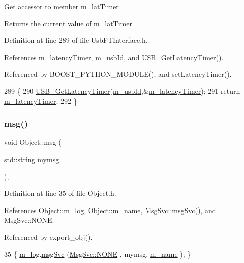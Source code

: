 Get accessor to member m\+\_\+lat\+Timer \begin{DoxyReturn}{Returns}
the current value of m\+\_\+lat\+Timer 
\end{DoxyReturn}


Definition at line 289 of file Usb\+F\+T\+Interface.\+h.



References m\+\_\+latency\+Timer, m\+\_\+usb\+Id, and U\+S\+B\+\_\+\+Get\+Latency\+Timer().



Referenced by B\+O\+O\+S\+T\+\_\+\+P\+Y\+T\+H\+O\+N\+\_\+\+M\+O\+D\+U\+L\+E(), and set\+Latency\+Timer().


\begin{DoxyCode}
289                                 \{
290     \hyperlink{LALUsbML_8h_a90c0ec96b211bb1b45c4b26afe6f6ced}{USB\_GetLatencyTimer}(\hyperlink{classUsbFTInterface_a91df5c0547e8be460bc087e27afe05aa}{m\_usbId},&\hyperlink{classUsbFTInterface_a0eefe6f2cee132da70176562cd126718}{m\_latencyTimer});
291     \textcolor{keywordflow}{return} \hyperlink{classUsbFTInterface_a0eefe6f2cee132da70176562cd126718}{m\_latencyTimer};
292   \}
\end{DoxyCode}
\mbox{\label{classObject_a58b2d0618c2d08cf2383012611528d97}} 
\subsubsection{\texorpdfstring{msg()}{msg()}\hspace{0.1cm}{\footnotesize\ttfamily [1/2]}}
{\footnotesize\ttfamily void Object\+::msg (\begin{DoxyParamCaption}\item[{std\+::string}]{mymsg }\end{DoxyParamCaption})\hspace{0.3cm}{\ttfamily [inline]}, {\ttfamily [inherited]}}



Definition at line 35 of file Object.\+h.



References Object\+::m\+\_\+log, Object\+::m\+\_\+name, Msg\+Svc\+::msg\+Svc(), and Msg\+Svc\+::\+N\+O\+NE.



Referenced by export\+\_\+obj().


\begin{DoxyCode}
35 \{ \hyperlink{classObject_a0d269813dd7ac1f24bc143031e2963f2}{m\_log}.\hyperlink{classMsgSvc_ad25f18047920cc59a314e5098259711c}{msgSvc} (\hyperlink{classMsgSvc_ae671eb7301996cd049d2da8a65925926a9be9ae32fed8e1e6eba4a58692210fbd}{MsgSvc::NONE}    , mymsg, \hyperlink{classObject_a8b83c95c705d2c3ba0d081fe1710f48d}{m\_name} ); \}
\end{DoxyCode}
\mbox{\label{classObject_ac5d59299273cee27aacf7de00d2e7034}} 
